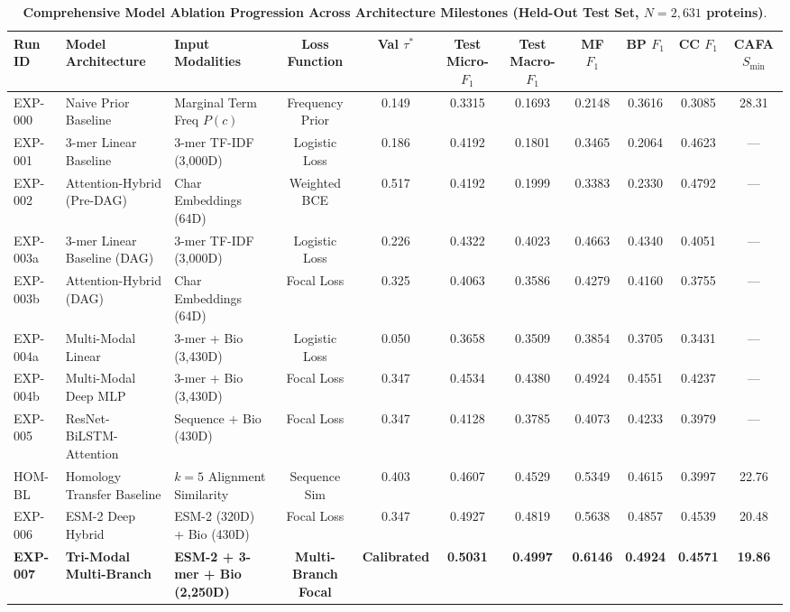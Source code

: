 \documentclass[10pt]{article}
\begin{document}
\begin{table}[h!]
\centering
\caption{\textbf{Comprehensive Model Ablation Progression Across Architecture Milestones (Held-Out Test Set, $N=2,631$ proteins)}.}
\label{tab:ablation_full}
\begin{adjustbox}{width=\textwidth}
\begin{tabular}{lllcccccccc}
\toprule
\textbf{Run ID} & \textbf{Model Architecture} & \textbf{Input Modalities} & \textbf{Loss Function} & \textbf{Val $\tau^*$} & \textbf{Test Micro-$F_1$} & \textbf{Test Macro-$F_1$} & \textbf{MF $F_1$} & \textbf{BP $F_1$} & \textbf{CC $F_1$} & \textbf{CAFA $S_{\min}$} \\
\midrule
EXP-000 & Naive Prior Baseline & Marginal Term Freq $P(c)$ & Frequency Prior & 0.149 & 0.3315 & 0.1693 & 0.2148 & 0.3616 & 0.3085 & 28.31 \\
EXP-001 & 3-mer Linear Baseline & 3-mer TF-IDF (3,000D) & Logistic Loss & 0.186 & 0.4192 & 0.1801 & 0.3465 & 0.2064 & 0.4623 & --- \\
EXP-002 & Attention-Hybrid (Pre-DAG) & Char Embeddings (64D) & Weighted BCE & 0.517 & 0.4192 & 0.1999 & 0.3383 & 0.2330 & 0.4792 & --- \\
EXP-003a & 3-mer Linear Baseline (DAG) & 3-mer TF-IDF (3,000D) & Logistic Loss & 0.226 & 0.4322 & 0.4023 & 0.4663 & 0.4340 & 0.4051 & --- \\
EXP-003b & Attention-Hybrid (DAG) & Char Embeddings (64D) & Focal Loss & 0.325 & 0.4063 & 0.3586 & 0.4279 & 0.4160 & 0.3755 & --- \\
EXP-004a & Multi-Modal Linear & 3-mer + Bio (3,430D) & Logistic Loss & 0.050 & 0.3658 & 0.3509 & 0.3854 & 0.3705 & 0.3431 & --- \\
EXP-004b & Multi-Modal Deep MLP & 3-mer + Bio (3,430D) & Focal Loss & 0.347 & 0.4534 & 0.4380 & 0.4924 & 0.4551 & 0.4237 & --- \\
EXP-005 & ResNet-BiLSTM-Attention & Sequence + Bio (430D) & Focal Loss & 0.347 & 0.4128 & 0.3785 & 0.4073 & 0.4233 & 0.3979 & --- \\
HOM-BL & Homology Transfer Baseline & $k=5$ Alignment Similarity & Sequence Sim & 0.403 & 0.4607 & 0.4529 & 0.5349 & 0.4615 & 0.3997 & 22.76 \\
EXP-006 & ESM-2 Deep Hybrid & ESM-2 (320D) + Bio (430D) & Focal Loss & 0.347 & 0.4927 & 0.4819 & 0.5638 & 0.4857 & 0.4539 & 20.48 \\
\textbf{EXP-007} & \textbf{Tri-Modal Multi-Branch} & \textbf{ESM-2 + 3-mer + Bio (2,250D)} & \textbf{Multi-Branch Focal} & \textbf{Calibrated} & \textbf{0.5031} & \textbf{0.4997} & \textbf{0.6146} & \textbf{0.4924} & \textbf{0.4571} & \textbf{19.86} \\
\bottomrule
\end{tabular}
\end{adjustbox}
\end{table}
\end{document}
